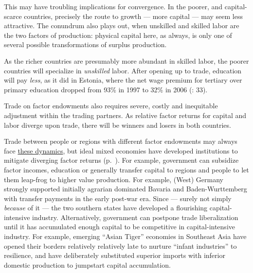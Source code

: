 This may have troubling implications for convergence. In the poorer, and capital-scarce countries, precisely the route to growth --- more capital --- may seem less attractive. The conundrum also plays out, when unskilled and skilled labor are the two factors of production: physical capital here, as always, is only one of several possible transformations of surplus production. 

As the richer countries are presumably more abundant in skilled labor, the poorer countries will specialize in \emph{unskilled} labor. After opening up to trade, education will pay \emph{less}, as it did in Estonia, where the net wage premium for tertiary over primary education dropped from 93\% in 1997 to 32\% in 2006 (\citealt{Piatkowski2008}: 33).


Trade on factor endowments also requires severe, costly and inequitable adjustment within the trading partners. As relative factor returns for capital and labor diverge upon trade, there will be winners and losers in both countries. 

Trade between people or regions with different factor endowments may always face \hyperref[sec:space]{these dynamics}, but ideal mixed economies have developed institutions to mitigate diverging factor returns (p.~\pageref{sec:space}). For example, government can subsidize factor incomes, education or generally transfer capital to regions and people to let them leap-frog to higher value production. For example, (West) Germany strongly supported initially agrarian dominated Bavaria and Baden-Wurttemberg with transfer payments in the early post-war era. Since --- surely not simply \emph{because} of it --- the two southern states have developed a flourishing capital-intensive industry. Alternatively, government can postpone trade liberalization until it has accumulated enough capital to be competitive in capital-intensive industry. For example, emerging ``Asian Tiger'' economies in Southeast Asia have opened their borders relatively relatively late to nurture ``infant industries'' to resilience, and have deliberately substituted superior imports with inferior domestic production to jumpstart capital accumulation.

